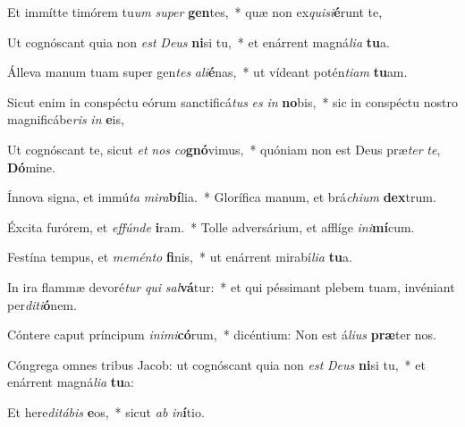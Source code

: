 \item Et immítte timórem tu\textit{um} \textit{su}\textit{per} \textbf{gen}tes,~* quæ non ex\textit{qui}\textit{si}\textbf{é}runt te,
\item Ut cognóscant quia non \textit{est} \textit{De}\textit{us} \textbf{ni}si tu,~* et enárrent magná\textit{li}\textit{a} \textbf{tu}a.
\item Álleva manum tuam super gen\textit{tes} \textit{a}\textit{li}\textbf{é}nas,~* ut vídeant potén\textit{ti}\textit{am} \textbf{tu}am.
\item Sicut enim in conspéctu eórum sanctificá\textit{tus} \textit{es} \textit{in} \textbf{no}bis,~* sic in conspéctu nostro magnificábe\textit{ris} \textit{in} \textbf{e}is,
\item Ut cognóscant te, sicut \textit{et} \textit{nos} \textit{co}\textbf{gnó}vimus,~* quóniam non est Deus præ\textit{ter} \textit{te}, \textbf{Dó}mine.
\item Ínnova signa, et immú\textit{ta} \textit{mi}\textit{ra}\textbf{bí}lia.~* Glorífica manum, et brá\textit{chi}\textit{um} \textbf{dex}trum.
\item Éxcita furórem, et \textit{ef}\textit{fún}\textit{de} \textbf{i}ram.~* Tolle adversárium, et afflíge \textit{in}\textit{i}\textbf{mí}cum.
\item Festína tempus, et \textit{me}\textit{mén}\textit{to} \textbf{fi}nis,~* ut enárrent mirabí\textit{li}\textit{a} \textbf{tu}a.
\item In ira flammæ devoré\textit{tur} \textit{qui} \textit{sal}\textbf{vá}tur:~* et qui péssimant plebem tuam, invéniant per\textit{di}\textit{ti}\textbf{ó}nem.
\item Cóntere caput príncipum \textit{in}\textit{i}\textit{mi}\textbf{có}rum,~* dicéntium: Non est á\textit{li}\textit{us} \textbf{præ}ter nos.
\item Cóngrega omnes tribus Jacob: ut cognóscant quia non \textit{est} \textit{De}\textit{us} \textbf{ni}si tu,~* et enárrent magná\textit{li}\textit{a} \textbf{tu}a:
\item Et here\textit{di}\textit{tá}\textit{bis} \textbf{e}os,~* sicut \textit{ab} \textit{in}\textbf{í}tio.
